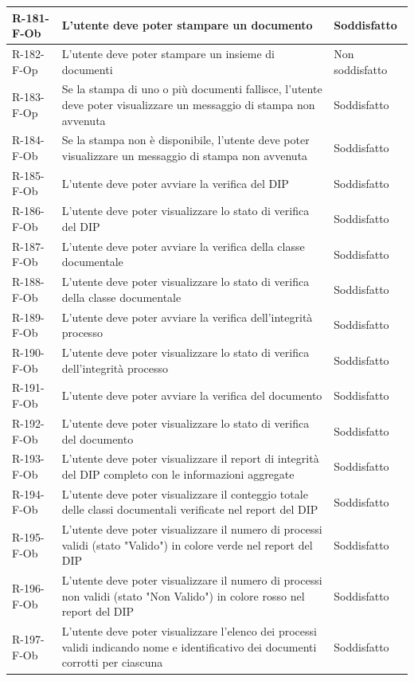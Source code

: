 \begin{longtable}{|p{2.5cm}|p{9.5cm}|p{2.5cm}|}
\hline
R-181-F-Ob & L'utente deve poter stampare un documento & Soddisfatto \\
\hline
R-182-F-Op & L'utente deve poter stampare un insieme di documenti & Non soddisfatto \\
\hline
R-183-F-Op & Se la stampa di uno o più documenti fallisce, l'utente deve poter visualizzare un messaggio di stampa non avvenuta & Soddisfatto \\
\hline
R-184-F-Ob & Se la stampa non è disponibile, l'utente deve poter visualizzare un messaggio di stampa non avvenuta & Soddisfatto \\
\hline
R-185-F-Ob & L'utente deve poter avviare la verifica del DIP & Soddisfatto \\
\hline
R-186-F-Ob & L'utente deve poter visualizzare lo stato di verifica del DIP & Soddisfatto \\
\hline
R-187-F-Ob & L'utente deve poter avviare la verifica della classe documentale & Soddisfatto\\
\hline
R-188-F-Ob & L'utente deve poter visualizzare lo stato di verifica della classe documentale & Soddisfatto \\
\hline
R-189-F-Ob & L'utente deve poter avviare la verifica dell'integrità processo & Soddisfatto \\
\hline
R-190-F-Ob & L'utente deve poter visualizzare lo stato di verifica dell'integrità processo & Soddisfatto \\
\hline
R-191-F-Ob & L'utente deve poter avviare la verifica del documento & Soddisfatto \\
\hline
R-192-F-Ob & L'utente deve poter visualizzare lo stato di verifica del documento & Soddisfatto \\
\hline
R-193-F-Ob & L'utente deve poter visualizzare il report di integrità del DIP completo con le informazioni aggregate & Soddisfatto \\
\hline
R-194-F-Ob & L'utente deve poter visualizzare il conteggio totale delle classi documentali verificate nel report del DIP & Soddisfatto \\
\hline
R-195-F-Ob & L'utente deve poter visualizzare il numero di processi validi (stato "Valido") in colore verde nel report del DIP & Soddisfatto \\
\hline
R-196-F-Ob & L'utente deve poter visualizzare il numero di processi non validi (stato "Non Valido") in colore rosso nel report del DIP & Soddisfatto \\
\hline
R-197-F-Ob & L'utente deve poter visualizzare l'elenco dei processi validi indicando nome e identificativo dei documenti corrotti per ciascuna & Soddisfatto \\

\end{longtable}
